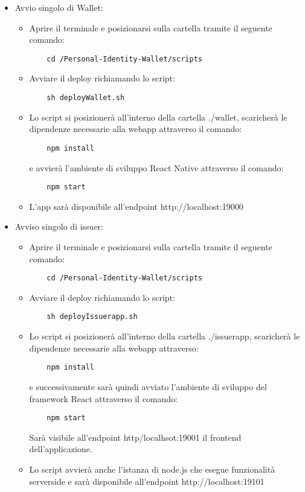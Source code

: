 \begin{itemize}
\item Avvio singolo di Wallet:
\begin{itemize}
\item Aprire il terminale e posizionarsi sulla cartella tramite il seguente comando: 
\begin{verbatim}
    cd /Personal-Identity-Wallet/scripts
\end{verbatim}
\item Avviare il deploy richiamando lo script:
\begin{verbatim}
    sh deployWallet.sh
\end{verbatim} 
\item Lo script si posizionerà all'interno della cartella ./wallet, scaricherà le dipendenze necessarie alla webapp attraverso il comando:
\begin{verbatim}
    npm install 
\end{verbatim}
    e avvierà l’ambiente di sviluppo React Native attraverso il comando:
\begin{verbatim}
    npm start
\end{verbatim}
\item L’app sarà disponibile all'endpoint http://localhost:19000
\end{itemize}

\item Avviso singolo di issuer:
\begin{itemize}
\item Aprire il terminale e posizionarsi sulla cartella tramite il seguente comando: 
\begin{verbatim}
    cd /Personal-Identity-Wallet/scripts
\end{verbatim}
\item Avviare il deploy richiamando lo script:
\begin{verbatim}
    sh deployIssuerapp.sh
\end{verbatim}
\item Lo script si posizionerà all'interno della cartella ./issuerapp, scaricherà le dipendenze necessarie alla webapp attraverso: 
\begin{verbatim}
    npm install 
\end{verbatim}
    e successivamente sarà quindi avviato l’ambiente di sviluppo del framework React attraverso il comando:
\begin{verbatim}
    npm start 
\end{verbatim}
Sarà visibile all'endpoint http/localhsot:19001 il frontend dell'applicazione.
\item Lo script avvierà anche l’istanza di node.js che esegue funzionalità serverside e sarà disponibile all'endpoint http://localhost:19101
\end{itemize}


\end{itemize}
